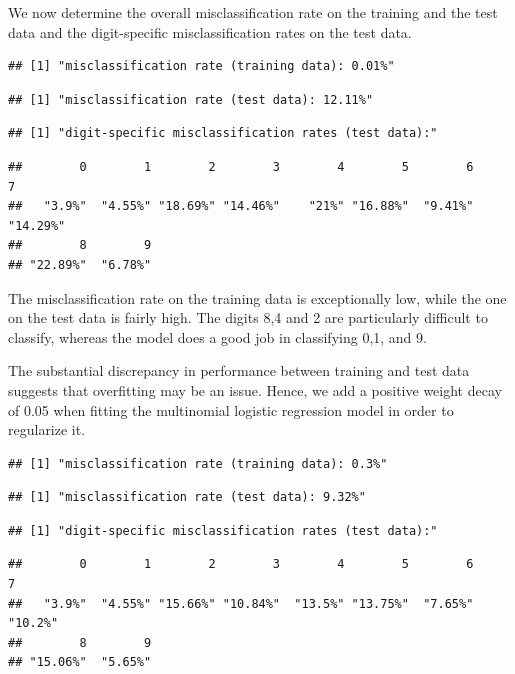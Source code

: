 \documentclass[
]{article}
\begin{document}
We now determine the overall misclassification rate on the training and
the test data and the digit-specific misclassification rates on the test
data.

\begin{verbatim}
## [1] "misclassification rate (training data): 0.01%"
\end{verbatim}

\begin{verbatim}
## [1] "misclassification rate (test data): 12.11%"
\end{verbatim}

\begin{verbatim}
## [1] "digit-specific misclassification rates (test data):"
\end{verbatim}

\begin{verbatim}
##        0        1        2        3        4        5        6        7 
##   "3.9%"  "4.55%" "18.69%" "14.46%"    "21%" "16.88%"  "9.41%" "14.29%" 
##        8        9 
## "22.89%"  "6.78%"
\end{verbatim}

The misclassification rate on the training data is exceptionally low,
while the one on the test data is fairly high. The digits 8,4 and 2 are
particularly difficult to classify, whereas the model does a good job in
classifying 0,1, and 9.

The substantial discrepancy in performance between training and test
data suggests that overfitting may be an issue. Hence, we add a positive
weight decay of 0.05 when fitting the multinomial logistic regression
model in order to regularize it.

\begin{verbatim}
## [1] "misclassification rate (training data): 0.3%"
\end{verbatim}

\begin{verbatim}
## [1] "misclassification rate (test data): 9.32%"
\end{verbatim}

\begin{verbatim}
## [1] "digit-specific misclassification rates (test data):"
\end{verbatim}

\begin{verbatim}
##        0        1        2        3        4        5        6        7 
##   "3.9%"  "4.55%" "15.66%" "10.84%"  "13.5%" "13.75%"  "7.65%"  "10.2%" 
##        8        9 
## "15.06%"  "5.65%"
\end{verbatim}
\end{document}
